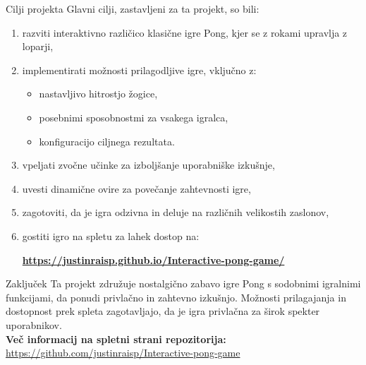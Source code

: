 \documentclass{beamer}
\begin{document}
\begin{frame}{Cilji projekta}
    Glavni cilji, zastavljeni za ta projekt, so bili:
    \begin{enumerate}
        \item razviti interaktivno različico klasične igre Pong, kjer se z rokami upravlja z loparji,
        \item implementirati možnosti prilagodljive igre, vključno z:
            \begin{itemize}
                \item nastavljivo hitrostjo žogice,
                \item posebnimi sposobnostmi za vsakega igralca,
                \item konfiguracijo ciljnega rezultata.
            \end{itemize}
        \item vpeljati zvočne učinke za izboljšanje uporabniške izkušnje,
        \item uvesti dinamične ovire za povečanje zahtevnosti igre,
        \item zagotoviti, da je igra odzivna in deluje na različnih velikostih zaslonov,
        \item gostiti igro na spletu za lahek dostop na:
        \begin{center}
            \textbf{\url{https://justinraisp.github.io/Interactive-pong-game/}}
        \end{center}
    \end{enumerate}
\end{frame}

\begin{frame}{Zaključek}
    Ta projekt združuje nostalgično zabavo igre Pong s sodobnimi igralnimi funkcijami, da ponudi privlačno in zahtevno izkušnjo. Možnosti prilagajanja in dostopnost prek spleta zagotavljajo, da je igra privlačna za širok spekter uporabnikov. \\
    
    \bigskip
    \textbf{Več informacij na spletni strani repozitorija:} \\
    \url{https://github.com/justinraisp/Interactive-pong-game}
\end{frame}
\end{document}
